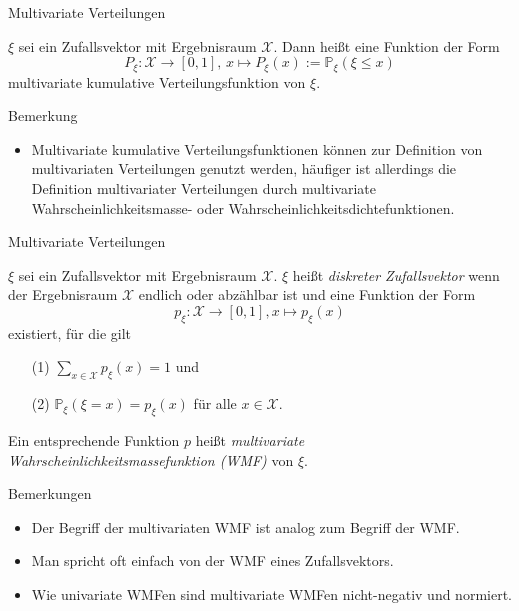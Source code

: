 \documentclass[
  8pt,
  ignorenonframetext,
]{beamer}
\providecommand{\tightlist}{%
  \setlength{\itemsep}{0pt}\setlength{\parskip}{0pt}}
\begin{document}
\begin{frame}{Multivariate Verteilungen}
\protect\hypertarget{multivariate-verteilungen-4}{}
\small
\begin{definition}
$\xi$ sei ein Zufallsvektor mit Ergebnisraum $\mathcal{X}$. Dann heißt eine Funktion
der Form
\begin{equation}
P_\xi : \mathcal{X} \to [0,1],\, x \mapsto P_\xi(x) := \mathbb{P}_\xi(\xi \le x)
\end{equation}
multivariate kumulative Verteilungsfunktion von $\xi$.
\end{definition}

Bemerkung

\begin{itemize}
\tightlist
\item
  \justifying Multivariate kumulative Verteilungsfunktionen können zur
  Definition von multivariaten Verteilungen genutzt werden, häufiger ist
  allerdings die Definition multivariater Verteilungen durch
  multivariate Wahrscheinlichkeitsmasse- oder
  Wahrscheinlichkeitsdichtefunktionen.
\end{itemize}
\end{frame}

\begin{frame}{Multivariate Verteilungen}
\protect\hypertarget{multivariate-verteilungen-5}{}
\small
\begin{definition}
\justifying
$\xi$ sei ein Zufallsvektor mit Ergebnisraum $\mathcal{X}$. $\xi$ heißt
\textit{diskreter Zufallsvektor} wenn der Ergebnisraum $\mathcal{X}$ endlich oder
abzählbar ist und eine Funktion der Form
\begin{equation}
p_\xi : \mathcal{X} \to [0,1], x \mapsto p_\xi(x)
\end{equation}
existiert, für die gilt
\begin{itemize}
\item[(1)] $\sum_{x \in \mathcal{X}}p_\xi(x) = 1$ und
\item[(2)] $\mathbb{P}_\xi(\xi = x) = p_\xi(x)$ für alle $x \in \mathcal{X}$.
\end{itemize}
Ein entsprechende Funktion $p$ heißt \textit{multivariate Wahrscheinlichkeitsmassefunktion (WMF)} von $\xi$.
\end{definition}

Bemerkungen

\begin{itemize}
\tightlist
\item
  Der Begriff der multivariaten WMF ist analog zum Begriff der WMF.
\item
  Man spricht oft einfach von der WMF eines Zufallsvektors.
\item
  Wie univariate WMFen sind multivariate WMFen nicht-negativ und
  normiert.
\end{itemize}
\end{frame}
\end{document}
